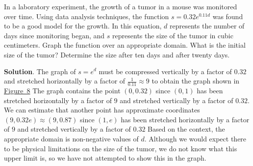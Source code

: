 \documentclass[10pt,]{book}
\theoremstyle{ptxdefinitionnotitle}
\theoremstyle{ptxdefinitiontitle}
\theoremstyle{ptxdefinitionnotitle}
\theoremstyle{ptxdefinitiontitle}
\theoremstyle{ptxdefinitionnotitle}
\theoremstyle{ptxdefinitiontitle}
\numberwithin{equation}{section}
\begin{document}
\begin{example}\label{example-16}
\hypertarget{p-240}{}%
In a laboratory experiment, the growth of a tumor in a mouse was monitored over time.  Using data analysis techniques, the function \(s = 0.32e^{0.11d}\) was found to be a good model for the growth.  In this equation, \(d\) represents the number of days since monitoring began, and \(s\) represents the size of the tumor in cubic centimeters. Graph the function over an appropriate domain.  What is the initial size of the tumor? Determine the size after ten days and after twenty days.%
\par\smallskip%
\noindent\textbf{Solution}.\hypertarget{solution-16}{}\quad%
\hypertarget{p-241}{}%
The graph of  \(s=e^d\) must be compressed vertically by a factor of \(0.32\) and stretched horizontally by a factor of \(\frac{1}{0.11} \approx 9\) to obtain the graph shown in \hyperref[figure-tumor-graph]{Figure~8}  The graph contains the point \((0,0.32)\) since \((0,1)\) has been stretched horizontally by a factor of \(9\) and stretched vertically by a factor of \(0.32\).  We can estimate that another point has approximate coordinates \((9,0.32e) \approx (9,0.87)\) since \((1,e)\) has been stretched horizontally by a factor of \(9\) and stretched vertically by a factor of \(0.32\) Based on the context, the appropriate domain is non-negative values of \(d\). Although we would expect there to be physical limitations on the size of the tumor, we do not know what this upper limit is, so we have not attempted to show this in the graph. \begin{figure}
\centering
{
}
\end{figure}
\end{example}
\end{document}
